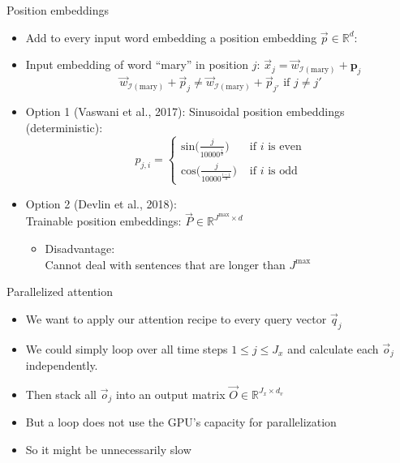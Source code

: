\begin{vbframe}{Position embeddings}

\vfill

\begin{itemize}
\item Add to every input word embedding a position embedding $\vec {p} \in \mathbb{R}^d$:
\item Input embedding of word ``mary'' in position $j$: $\vec {x}_j = \vec {w}_{\mathcal{I}(\text{mary})} + \mathbf{p}_j$
$$\vec {w}_{\mathcal{I}(\text{mary})} + \vec {p}_j \neq \vec{w}_{\mathcal{I}(\text{mary})} + \vec {p}_{j'} \text{ if } j \neq j'$$
\item Option 1 (Vaswani et al., 2017): Sinusoidal position embeddings (deterministic): 
$$p_{j,i} = \begin{cases} \mathrm{sin}\big(\frac{j}{10000^\frac{i}{d}}\big)  & \text{ if } i \text{ is even} \\ \mathrm{cos}\big(\frac{j}{10000^\frac{i-1}{d}}\big) & \text{ if } i \text{ is odd}  \end{cases}$$
\item Option 2 (Devlin et al., 2018):\\Trainable position embeddings: $\vec {P} \in \mathbb{R}^{J^\mathrm{max} \times d}$
\begin{itemize}
\item Disadvantage:\\Cannot deal with sentences that are longer than $J^\mathrm{max}$
\end{itemize}
\end{itemize}

\vfill

\end{vbframe}


\begin{vbframe}{Parallelized attention}

\vfill

\begin{itemize}
\item We want to apply our attention recipe to every query vector $\vec q_j$
\item We could simply loop over all time steps $1 \leq j \leq J_x$ and calculate each $\vec o_j$ independently.
\item Then stack all $\vec o_j$ into an output matrix $\vec O \in \mathbb{R}^{J_x \times d_v}$
\item But a loop does not use the GPU's capacity for parallelization
\item So it might be unnecessarily slow
\end{itemize}

\vfill

\end{vbframe}

